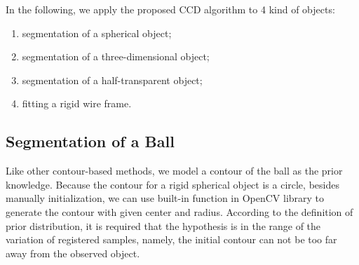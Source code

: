In the following, we apply the proposed CCD algorithm to 4 kind of
objects:
\begin{enumerate}
\item segmentation of a spherical object;
\item segmentation of a three-dimensional object;
\item segmentation of a half-transparent object;
\item fitting a rigid wire frame.
\end{enumerate}

\subsection{Segmentation of a Ball}
\label{sec:sb}
Like other contour-based methods, we model a contour of the ball as the
prior knowledge. Because the contour for a rigid spherical object is a
circle, besides manually initialization, we can use built-in function in
OpenCV library to generate the contour with given center and
radius. According to the definition of prior distribution, it is required
that the hypothesis is in the range of the variation of
registered samples, namely, the initial contour can not be too far away
from the observed object.

